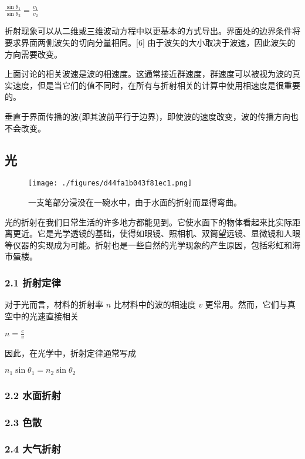 $\frac{\sin \theta_1}{\sin \theta_2} = \frac{v_1}{v_2}  $

折射现象可以从二维或三维波动方程中以更基本的方式导出。界面处的边界条件将要求界面两侧波矢的切向分量相同。[6] 由于波矢的大小取决于波速，因此波矢的方向需要改变。

上面讨论的相关波速是波的相速度。这通常接近群速度，群速度可以被视为波的真实速度，但是当它们的值不同时，在所有与折射相关的计算中使用相速度是很重要的。

垂直于界面传播的波(即其波前平行于边界)，即使波的速度改变，波的传播方向也不会改变。

\subsection{光}

\begin{figure}[ht]
\centering
\texttt{[image: ./figures/d44fa1b043f81ec1.png]}
\caption{一支笔部分浸没在一碗水中，由于水面的折射而显得弯曲。} \label{fig_ZS_3}
\end{figure}

光的折射在我们日常生活的许多地方都能见到。它使水面下的物体看起来比实际距离更近。它是光学透镜的基础，使得如眼镜、照相机、双筒望远镜、显微镜和人眼等仪器的实现成为可能。折射也是一些自然的光学现象的产生原因，包括彩虹和海市蜃楼。

\subsubsection{2.1 折射定律}

对于光而言，材料的折射率 $n$ 比材料中的波的相速度 $v$ 更常用。然而，它们与真空中的光速直接相关

$n = \frac{c}{v}$

因此，在光学中，折射定律通常写成

$n_1 \sin \theta_1 = n_2 \sin \theta_2$


\subsubsection{2.2 水面折射}

\subsubsection{2.3 色散}

\subsubsection{2.4 大气折射}

